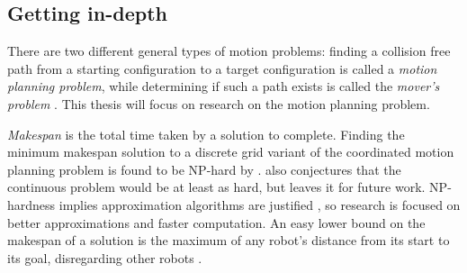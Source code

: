 \subsection{Getting in-depth}


There are two different general types of motion problems: finding a collision free path from a starting configuration to a target configuration is called a \emph{motion planning problem}, while determining if such a path exists is called the \emph{mover's problem} \cite{hopcroftReducingMultipleObject1986}. 
This thesis will focus on research on the motion planning problem. 

\emph{Makespan} is the total time taken by a solution to complete. 
Finding the minimum makespan solution to a discrete grid variant of the coordinated motion planning problem is found to be NP-hard by \cite{demaineCoordinatedMotionPlanning2019}. \cite{demaineCoordinatedMotionPlanning2019} also conjectures that the continuous problem would be at least as hard, but leaves it for future work. 
NP-hardness implies approximation algorithms are justified \cite{demaineCoordinatedMotionPlanning2019}, so research is focused on better approximations and faster computation. 
An easy lower bound on the makespan of a solution is the maximum of any robot's distance from its start to its goal, disregarding other robots \cite{demaineCoordinatedMotionPlanning2019}. 


